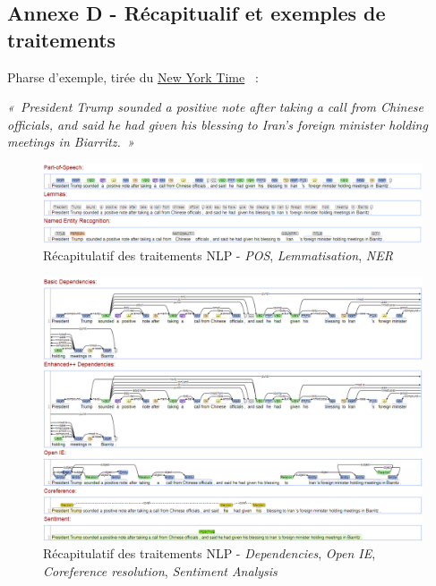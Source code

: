 \subsection*{Annexe D - Récapitualif et exemples de traitements}

Pharse d'exemple, tirée du \href{https://www.nytimes.com/2019/08/26/world/europe/g7-live-updates.html?action=click&module=Top\%20Stories&pgtype=Homepage}{New York Time} \cite{sent-ex}~:

\textit{«~President Trump sounded a positive note after taking a call from Chinese officials, and said he had given his blessing to Iran’s foreign minister holding meetings in Biarritz.~»}

\begin{figure}[H]
    \centering
    \includegraphics[scale=0.50]{images/nlp-recap-1.png}
    \caption{Récapitulatif des traitements NLP - \textit{POS}, \textit{Lemmatisation}, \textit{NER}}
    \label{fig:nlp-recap-1}
\end{figure}

\begin{figure}[H]
    \centering
    \includegraphics[scale=0.50]{images/nlp-recap-2.png}
    \caption{Récapitulatif des traitements NLP - \textit{Dependencies}, \textit{Open IE}, \textit{Coreference resolution}, \textit{Sentiment Analysis}}
    \label{fig:my_label}
\end{figure}

